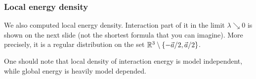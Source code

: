 \documentclass[10pt,t]{beamer}
\begin{document}
\begin{frame}
  \frametitle{Local energy density}


  We also computed local energy density. Interaction part of it
  in the limit $\lambda \searrow 0$ is shown on the next slide (not the shortest
  formula that you can imagine). More precisely, it is a regular
  distribution on the set $\mathbb{R}^{ 3 } \setminus \{ -\vec{a} / 2, \vec{a} / 2\}$.

  One should note that local density of interaction energy is model
  \alert{independent}, while global energy is heavily model depended. %

\end{frame}
\end{document}
